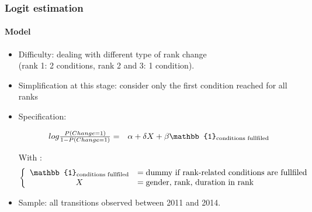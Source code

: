 \documentclass[xcolor=table,ignorenonframetext,12pt]{beamer}
\newenvironment{choixmarges}[2]{\begin{list}{}{%
\setlength{\topsep}{0pt}%
\setlength{\leftmargin}{0pt}%
\setlength{\rightmargin}{0pt}%
\setlength{\listparindent}{\parindent}%
\setlength{\itemindent}{\parindent}%
\setlength{\parsep}{0pt plus 1pt}%
\addtolength{\leftmargin}{#1}%
\addtolength{\rightmargin}{#2}%
}\item }{\end{list}}
\begin{document}
\begin{frame}
\frametitle{Logit estimation}
\framesubtitle{Model}
\begin{choixmarges}{-0.7cm}{-0.7cm}


\begin{itemize}
\item Difficulty: dealing with different type of rank change\\ (rank 1: 2 conditions, rank 2 and 3: 1 condition).
\item Simplification at this stage: consider only the first condition reached for all ranks
\item Specification:



\small
\begin{equation*}
\begin{array}{c l}
log \frac{P(Change=1)}{1 - P(Change=1)} =& \alpha  + \delta X + \beta \mathbb{1}_{{\text{conditions fullfiled}}} 
\end{array} 
\end{equation*}

With :
\vspace{-0.1cm}
\begin{equation*}
\left\{\begin{array}{c  l}
\mathbb{1}_{{\text{conditions fullfiled}}}   &= \text{dummy if rank-related conditions are fullfiled}  \\
X &= \text{gender, rank, duration in rank} \\
\end{array} \right.  
\end{equation*}
\normalsize


\item Sample: all transitions observed between 2011 and 2014.

\end{itemize}

\end{choixmarges}

\end{frame}


\end{document}
